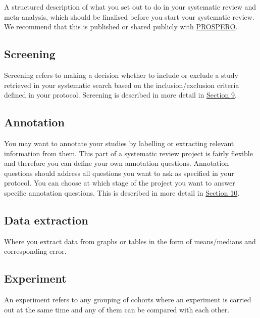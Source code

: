 \documentclass[
]{book}
\begin{document}
A structured description of what you set out to do in your systematic review and meta-analysis, which should be finalised before you start your systematic review. We recommend that this is published or shared publicly with \href{https://www.crd.york.ac.uk/prospero/}{PROSPERO}.

\hypertarget{screening}{%
\subsection{Screening}\label{screening}}

Screening refers to making a decision whether to include or exclude a study retrieved in your systematic search based on the inclusion/exclusion criteria defined in your protocol. Screening is described in more detail in \href{https://camaradesuk.github.io/syrf_userguide/projectscreening.html}{Section 9}.

\hypertarget{annotation}{%
\subsection{Annotation}\label{annotation}}

You may want to annotate your studies by labelling or extracting relevant information from them. This part of a systematic review project is fairly flexible and therefore you can define your own annotation questions. Annotation questions should address all questions you want to ask as specified in your protocol. You can choose at which stage of the project you want to answer specific annotation questions. This is described in more detail in \href{https://camaradesuk.github.io/syrf_userguide/projectannotation.html}{Section 10}.

\hypertarget{data-extraction}{%
\subsection{Data extraction}\label{data-extraction}}

Where you extract data from graphs or tables in the form of means/medians and corresponding error.

\hypertarget{experiment}{%
\subsection{Experiment}\label{experiment}}

An experiment refers to any grouping of cohorts where an experiment is carried out at the same time and any of them can be compared with each other.
\end{document}
